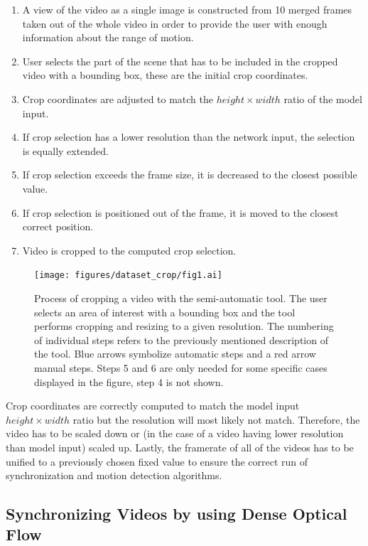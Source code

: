 \begin{enumerate}
    \item A view of the video as a single image is constructed from 10 merged frames taken out of the whole video in order to provide the user with enough information about the range of motion.
    \item User selects the part of the scene that has to be included in the cropped video with a bounding box, these are the initial crop coordinates.
    \item Crop coordinates are adjusted to match the $height \times width$ ratio of the model input.
    \item If crop selection has a lower resolution than the network input, the selection is equally extended.
    \item If crop selection exceeds the frame size, it is decreased to the closest possible value.
    \item If crop selection is positioned out of the frame, it is moved to the closest correct position.
    \item Video is cropped to the computed crop selection.
\end{enumerate}

\begin{figure}[ht]\centering
    \centering
    \texttt{[image: figures/dataset\_crop/fig1.ai]}
    \caption{Process of cropping a video with the semi-automatic tool. The user selects an area of interest with a bounding box and the tool performs cropping and resizing to a given resolution. The numbering of individual steps refers to the previously mentioned description of the tool. Blue arrows symbolize automatic steps and a red arrow manual steps. Steps 5 and 6 are only needed for some specific cases displayed in the figure, step 4 is not shown.}
    \label{fig:dataset-crop-process}
\end{figure}

Crop coordinates are correctly computed to match the model input $height \times width$ ratio but the resolution will most likely not match. Therefore, the video has to be scaled down or (in the case of a video having lower resolution than model input) scaled up. Lastly, the framerate of all of the videos has to be unified to a previously chosen fixed value to ensure the correct run of synchronization and motion detection algorithms.

\subsection{\label{sec:dataset-sync}Synchronizing Videos by using Dense Optical Flow}

